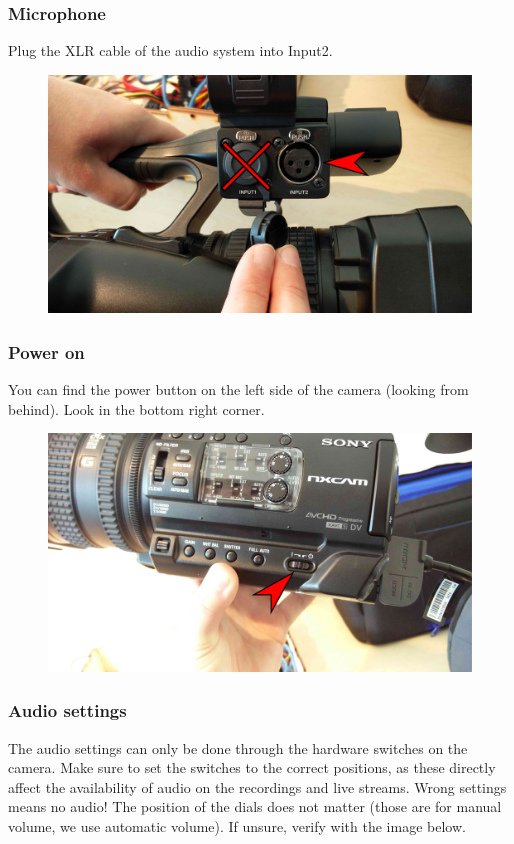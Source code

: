 \documentclass{article}
\begin{document}
\subsubsection{Microphone}
Plug the XLR cable of the audio system into Input2.

\begin{figure}[H]
  \centering
\includegraphics[width = 120mm]{Sony02.jpg}
\end{figure}

\subsubsection{Power on}
You can find the power button on the left side of the camera (looking from behind). Look in the bottom right corner.

\begin{figure}[H]
  \centering
\includegraphics[width = 120mm]{Sony03.jpg}
\end{figure}

\subsubsection{Audio settings}
The audio settings can only be done through the hardware switches on the camera.
Make sure to set the switches to the correct positions, as these directly affect the availability of audio on the recordings and live streams. Wrong settings means no audio!
The position of the dials does not matter (those are for manual volume, we use automatic volume).
If unsure, verify with the image below.
\end{document}
